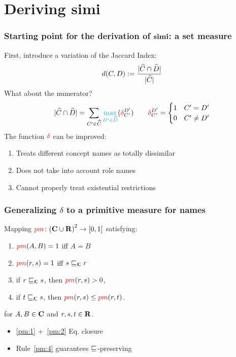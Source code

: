 \documentclass[smaller]{beamer}
\begin{document}
\section{Deriving simi}

\begin{frame}
  \frametitle{Starting point for the derivation of \(\operatorname{\mathbf{simi}}\): a set measure}
  First, introduce a variation of the \alert{Jaccard Index}:
  \begin{equation}
    d(C,D) := \frac{\abs{\atom{C} \cap \atom{D}}}%
                   {\abs{\atom{C}}}
  \end{equation}
  What about the numerator?
  \begin{equation}
    \abs{\atom{C} \cap \atom{D}} =
    \sum_{C^\prime \in \atom{C}}%
      \textcolor{cyan}{\max_{D^\prime \in \atom{D}}}%
      (\mydelta_{C^\prime}^{D^\prime})
    \qquad \mydelta_{C^\prime}^{D^\prime}
    = \begin{cases}
      1 & C^\prime = D^\prime \\ 0 & C^\prime \ne D^\prime
    \end{cases}
  \end{equation}
  \pause
  The function \(\textcolor{red}{\delta}\) can be improved:
  \begin{enumerate}[<+->]
    \item Treats different concept names as totally dissimilar
    \item Does not take into account role names
    \item Cannot properly treat existential restrictions
  \end{enumerate}
\end{frame}

\begin{frame}
  \frametitle{Generalizing \(\delta\) to a primitive measure for names}
  \begin{definition}
    Mapping \(\textcolor{red}{pm} \colon {(\mathbf{C}\cup \mathbf{R})}^2 \to [0,1]\)
    satisfying:
    \begin{enumerate}[<+->]
      \item\label{pm:1} \(\textcolor{red}{pm}(A,B) = 1\) iff \(A = B\)
      \item\label{pm:2} \(\textcolor{red}{pm}(r,s) = 1\) iff \(s \sqsubseteq_{\mathcal{K}} r\)
      \item\label{pm:3} if \(r \sqsubseteq_{\mathcal{K}} s\), then \(\textcolor{red}{pm}(r,s) > 0\),
      \item\label{pm:4} if \(t \sqsubseteq_{\mathcal{K}} s\), then \(\textcolor{red}{pm}(r,s) \le \textcolor{red}{pm}(r,t)\).
    \end{enumerate}
    for \(A,B \in \mathbf{C}\) and \(r,s,t \in \mathbf{R}\).
  \end{definition}
  \begin{itemize}[<+->]
    \item \ref{pm:1} +~\ref{pm:2} \textrightarrow Eq. closure
    \item Rule~\ref{pm:4} guarantees
    \(\sqsubseteq_{\mathcal{}}\)-preserving
  \end{itemize}
\end{frame}
\end{document}
